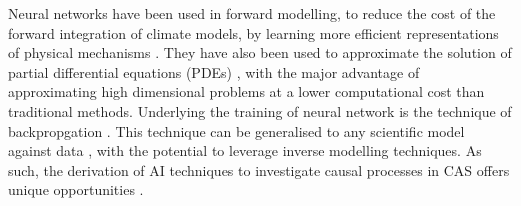 %
Neural networks have been used in forward modelling, to reduce the cost of the forward integration of climate models, by learning more efficient representations of physical mechanisms \cite{XXX}.
% 
They have also been used to approximate the solution of partial differential equations (PDEs) \cite{sirignano2018dgm}, with the major advantage of approximating high dimensional problems at a lower computational cost than traditional methods.
% 
% 
%
% 
Underlying the training of neural network is the technique of backpropgation \cite{XXX}. This technique can be generalised to any scientific model against data \cite{Rackauckas2020}, with the potential to leverage inverse modelling techniques. %
% 
% 
As such, the derivation of AI techniques to investigate causal processes in CAS offers unique opportunities \cite{Frank2022}.

